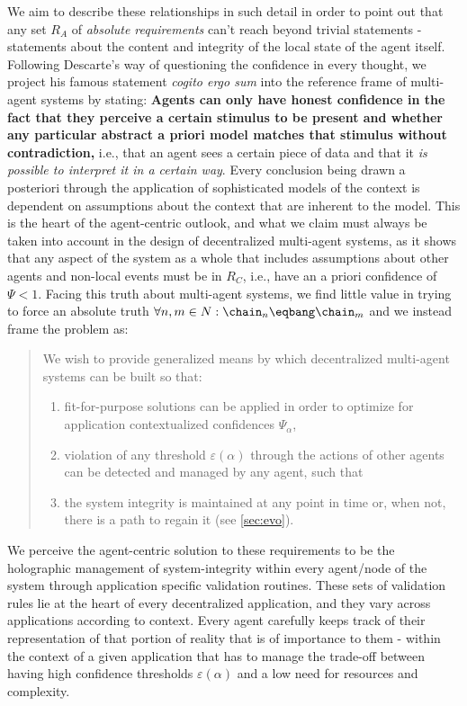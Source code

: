 \documentclass[twocolumn,showpacs,
  nofootinbib,aps,superscriptaddress,
  eqsecnum,prd,notitlepage,showkeys,10pt]{revtex4-1}
\begin{document}
We aim to describe these relationships in such detail in order to point out that any set $R_A$ of \textit{absolute requirements} can't reach beyond trivial statements - statements about the content and integrity of the local state of the agent itself. Following Descarte's way of questioning the confidence in every thought, we project his famous statement \textit{cogito ergo sum} into the reference frame of multi-agent systems by stating: \textbf{Agents can only have honest confidence in the fact that they perceive a certain stimulus to be present and whether any particular abstract a priori model matches that stimulus without contradiction,} i.e., that an agent sees a certain piece of data and that it \textit{is possible to interpret it in a certain way}. Every conclusion being drawn a posteriori through the application of sophisticated models of the context is dependent on assumptions about the context that are inherent to the model. This is the heart of the agent-centric outlook, and what we claim must always be taken into account in the design of decentralized multi-agent systems, as it shows that any aspect of the system as a whole that includes assumptions about other agents and non-local events must be in $R_C$, i.e., have an a priori confidence of $\Psi<1$. Facing this truth about multi-agent systems, we find little value in trying to force an absolute truth $\forall n,m \in N: \chain_n\eqbang\chain_m$ and we instead frame the problem as:
\\
\begin{quote}
We wish to provide generalized means by which decentralized multi-agent systems can be built so that:
\begin{enumerate}
\item fit-for-purpose solutions can be applied in order to optimize for application contextualized confidences $\Psi_\alpha$,
\item violation of any threshold $\varepsilon(\alpha)$ through the actions of other agents can be detected and managed by any agent, such that
\item the system integrity is maintained at any point in time or, when not, there is a path to regain it (see \ref{sec:evo}).
\end{enumerate}
\end{quote}

We perceive the agent-centric solution to these requirements to be the holographic management of system-integrity within every agent/node of the system through application specific validation routines. These sets of validation rules lie at the heart of every decentralized application, and they vary across applications according to context. Every agent carefully keeps track of their representation of that portion of reality that is of importance to them - within the context of a given application that has to manage the trade-off between having high confidence thresholds $\varepsilon(\alpha)$ and a low need for resources and complexity.
\end{document}
